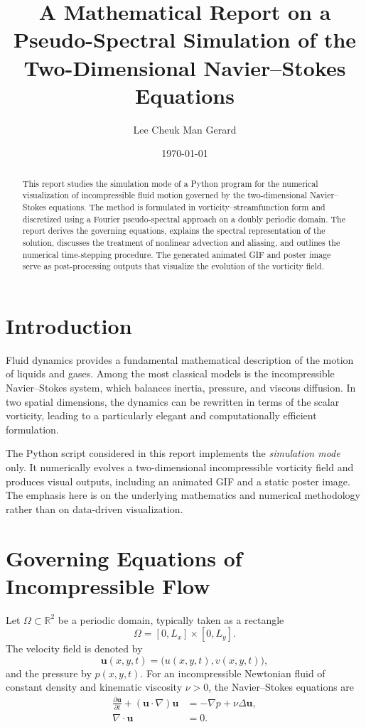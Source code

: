 \documentclass[11pt]{article}
\title{A Mathematical Report on a Pseudo-Spectral Simulation of the Two-Dimensional Navier--Stokes Equations}
\author{Lee Cheuk Man Gerard}
\date{\today}
\begin{document}
\maketitle

\begin{abstract}
This report studies the simulation mode of a Python program for the numerical visualization of incompressible fluid motion governed by the two-dimensional Navier--Stokes equations. The method is formulated in vorticity--streamfunction form and discretized using a Fourier pseudo-spectral approach on a doubly periodic domain. The report derives the governing equations, explains the spectral representation of the solution, discusses the treatment of nonlinear advection and aliasing, and outlines the numerical time-stepping procedure. The generated animated GIF and poster image serve as post-processing outputs that visualize the evolution of the vorticity field.
\end{abstract}

\tableofcontents
\newpage

\section{Introduction}

Fluid dynamics provides a fundamental mathematical description of the motion of liquids and gases. Among the most classical models is the incompressible Navier--Stokes system, which balances inertia, pressure, and viscous diffusion. In two spatial dimensions, the dynamics can be rewritten in terms of the scalar vorticity, leading to a particularly elegant and computationally efficient formulation.

The Python script considered in this report implements the \emph{simulation mode} only. It numerically evolves a two-dimensional incompressible vorticity field and produces visual outputs, including an animated GIF and a static poster image. The emphasis here is on the underlying mathematics and numerical methodology rather than on data-driven visualization.

\section{Governing Equations of Incompressible Flow}

Let $\Omega \subset \mathbb{R}^2$ be a periodic domain, typically taken as a rectangle
\[
\Omega = [0,L_x]\times [0,L_y].
\]
The velocity field is denoted by
\[
\mathbf{u}(x,y,t) = \bigl(u(x,y,t),v(x,y,t)\bigr),
\]
and the pressure by $p(x,y,t)$. For an incompressible Newtonian fluid of constant density and kinematic viscosity $\nu>0$, the Navier--Stokes equations are
\begin{align}
\frac{\partial \mathbf{u}}{\partial t} + (\mathbf{u}\cdot\nabla)\mathbf{u} &= -\nabla p + \nu \Delta \mathbf{u}, \label{eq:NS}\\
\nabla\cdot \mathbf{u} &= 0. \label{eq:incompressible}
\end{align}
\end{document}
